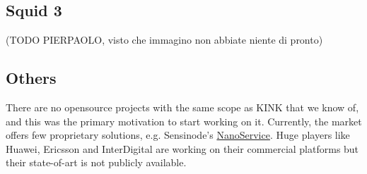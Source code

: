 \subsection{Squid 3}

(TODO PIERPAOLO, visto che immagino non abbiate niente di pronto)

\subsection{Others}

There are no opensource projects with the same scope as KINK that we know of, and this was the primary motivation to start working on it.
Currently, the market offers few proprietary solutions, e.g. Sensinode's \href{http://www.sensinode.com/EN/products/nanoservice.html}{NanoService}.  Huge players like Huawei, Ericsson and InterDigital are working on their commercial platforms but their state-of-art is not publicly available.